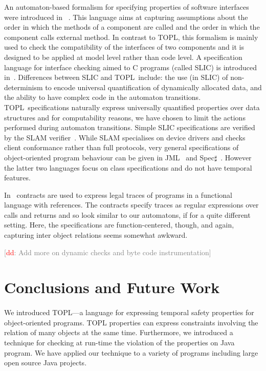\documentclass[10pt]{llncs} %
\newcommand{\TPL}{TOPL}
\newcommand{\noterg}[2]{\textcolor{gray}{[\textcolor{red}{#1}: #2]}}
\newcommand{\dd}[1]{\noterg{dd}{#1}}
\newcommand{\dinocomment}[1]{\dd{#1}}
\begin{document}
An automaton-based formalism for specifying properties of software interfaces were introduced in~\cite{dblp:conf/sigsoft/AlfaroH01} . 
This language aims at capturing assumptions about the order in which the methods of a component are called and the order in which the component calls external method.
In contrast to \TPL, this formalism is mainly used to check the compatibility of the interfaces of two components and it is designed to be applied at  model level rather than code level. A specification language for interface checking aimed to C programs (called SLIC) is introduced in~\cite{ball2002}.  
Differences between SLIC and \TPL \ include: the use (in SLIC) of
non-determinism to encode universal quantification of dynamically allocated data, and the  ability to have complex code in the automaton transitions. 
\TPL \ specifications naturally express universally quantified
properties over data structures and for computability reasons,  we
have chosen to limit the  actions performed during automaton transitions. 
Simple SLIC specifications are verified by  the SLAM verifier~\cite{dblp:conf/cav/ballr01}.
While SLAM specialises on device drivers and checks client conformance rather than full protocols, 
very general specifications of object-oriented program behaviour can be given in JML~\cite{jml} and Spec$\sharp$~\cite{DBLP:journals/jot/BarnettDFLS04}. However the latter two languages focus on class specifications and do not have temporal features.

In~\cite{disney2011} contracts are used to express legal traces of
programs in a functional language with references. The contracts
specify traces as regular expressions over calls and returns and so
look similar to our automatons, if for a quite different
setting. Here, the specifications are function-centered, though, and
again, capturing inter object relations seems somewhat awkward.

\dinocomment{Add more on dynamic checks and byte code instrumentation}

\section{Conclusions and Future Work}\label{sec:conclusions} %

\paragraph{}
We introduced TOPL---a language for expressing temporal safety properties for object-oriented programs.
TOPL properties can express constraints involving the relation of many objects at the same time. 
Furthermore, we introduced a technique for checking at run-time the violation of the properties
on Java program. We have applied our technique to a variety of programs including large open source Java projects.
%
\end{document}
